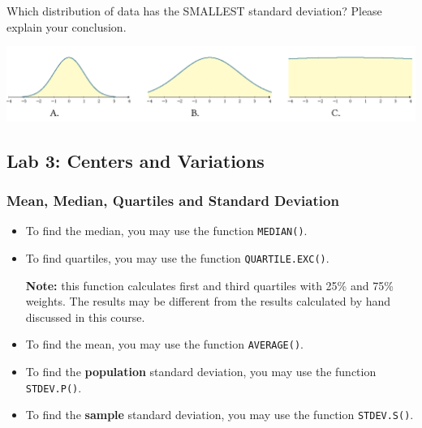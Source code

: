 \begin{exercise}

Which distribution of data has the SMALLEST standard deviation? Please
explain your conclusion.

\begin{fullwidth}
  \begin{center}
    \includegraphics{Figures/SD-Pic.png}
  \end{center}
\end{fullwidth}

\end{exercise}
\vspace*{6\baselineskip}

\hypertarget{lab-3-centers-and-variations}{%
\subsection{Lab 3: Centers and
Variations}\label{lab-3-centers-and-variations}}

\hypertarget{mean-median-quartiles-and-standard-deviation}{%
\subsubsection{Mean, Median, Quartiles and Standard
Deviation}\label{mean-median-quartiles-and-standard-deviation}}

\begin{itemize}
\item
  To find the median, you may use the function \texttt{MEDIAN()}.
\item
  To find quartiles, you may use the function \texttt{QUARTILE.EXC()}.

  \textbf{Note:} this function calculates first and third quartiles with
  25\% and 75\% weights. The results may be different from the results
  calculated by hand discussed in this course.
\item
  To find the mean, you may use the function \texttt{AVERAGE()}.
\item
  To find the \textbf{population} standard deviation, you may use the
  function \texttt{STDEV.P()}.
\item
  To find the \textbf{sample} standard deviation, you may use the
  function \texttt{STDEV.S()}.
\end{itemize}

